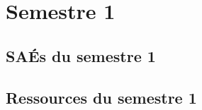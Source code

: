 \documentclass[10pt,french]{article} %
\begin{document}
%
%

%
%

\newpage


\section{Semestre 1}

\subsection{SAÉs du semestre 1}



\subsection{Ressources du semestre 1}


%
%
%
%
%
\newpage

\end{document}
